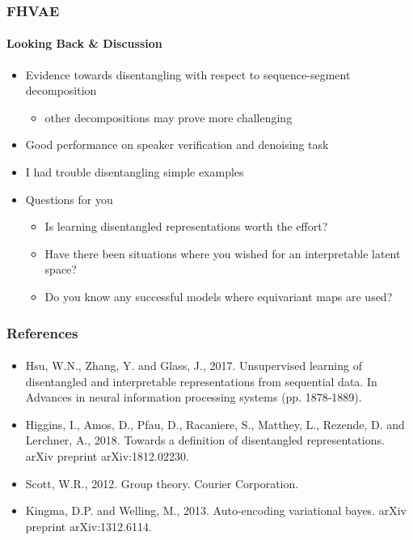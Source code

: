 \documentclass[9pt]{beamer}
\begin{document}
\begin{frame}
\frametitle{FHVAE}
\framesubtitle{Looking Back \& Discussion} %
\begin{itemize}
	\item Evidence towards disentangling with respect to sequence-segment decomposition
	\begin{itemize}
		\item other decompositions may prove more challenging
	\end{itemize}
	\item Good performance on speaker verification and denoising task
	\item I had trouble disentangling simple examples
	\item Questions for you
	\begin{itemize}
		\item Is learning disentangled representations worth the effort?
		\item Have there been situations where you wished for an interpretable latent space?
		\item Do you know any successful models where equivariant maps are used?
	\end{itemize}
\end{itemize}
\end{frame} 


\begin{frame}
\frametitle{References}
\framesubtitle{}
\begin{itemize}
	\item Hsu, W.N., Zhang, Y. and Glass, J., 2017. Unsupervised learning of disentangled and interpretable representations from sequential data. In Advances in neural information processing systems (pp. 1878-1889).
	\item Higgins, I., Amos, D., Pfau, D., Racaniere, S., Matthey, L., Rezende, D. and Lerchner, A., 2018. Towards a definition of disentangled representations. arXiv preprint arXiv:1812.02230.
	\item Scott, W.R., 2012. Group theory. Courier Corporation.
	\item Kingma, D.P. and Welling, M., 2013. Auto-encoding variational bayes. arXiv preprint arXiv:1312.6114.
\end{itemize}
\end{frame} 
\end{document}
